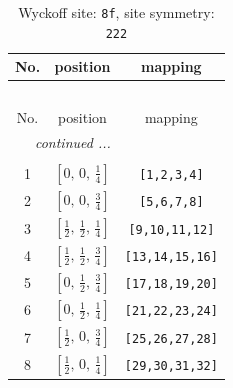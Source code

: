 \documentclass[fleqn,8pt]{jsarticle}
\begin{document}
\begin{longtable}{ccc}
\caption{Wyckoff site: {\tt 8f}, site symmetry: {\tt 222}}
 \\
 \hline \hline
No. & position & mapping \\ \hline \endfirsthead

\multicolumn{2}{l}{\tablename\ \thetable{}} \\
 \hline \hline
No. & position & mapping \\ \hline \endhead

 \hline \hline
\multicolumn{2}{r}{\footnotesize\it continued ...} \\ \endfoot

 \hline \hline
\multicolumn{2}{r}{} \\ \endlastfoot

1 & $\left[ 0,\, 0,\, \frac{1}{4} \right]$ & {\tt [1,2,3,4]} \\ \hline
2 & $\left[ 0,\, 0,\, \frac{3}{4} \right]$ & {\tt [5,6,7,8]} \\ \hline
3 & $\left[ \frac{1}{2},\, \frac{1}{2},\, \frac{1}{4} \right]$ & {\tt [9,10,11,12]} \\ \hline
4 & $\left[ \frac{1}{2},\, \frac{1}{2},\, \frac{3}{4} \right]$ & {\tt [13,14,15,16]} \\ \hline
5 & $\left[ 0,\, \frac{1}{2},\, \frac{3}{4} \right]$ & {\tt [17,18,19,20]} \\ \hline
6 & $\left[ 0,\, \frac{1}{2},\, \frac{1}{4} \right]$ & {\tt [21,22,23,24]} \\ \hline
7 & $\left[ \frac{1}{2},\, 0,\, \frac{3}{4} \right]$ & {\tt [25,26,27,28]} \\ \hline
8 & $\left[ \frac{1}{2},\, 0,\, \frac{1}{4} \right]$ & {\tt [29,30,31,32]} \\
\end{longtable}
\renewcommand{\arraystretch}{1.2}
\end{document}

